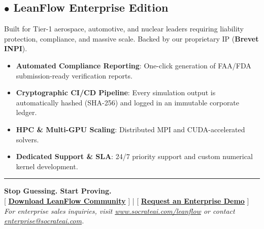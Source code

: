 \documentclass[11pt,a4paper]{article}
\begin{document}
\subsection*{\textcolor{blue!70!black}{$\bullet$} LeanFlow Enterprise Edition}
Built for Tier-1 aerospace, automotive, and nuclear leaders requiring liability protection, compliance, and massive scale. Backed by our proprietary IP (\textbf{Brevet INPI}).
\begin{itemize}
    \item \textbf{Automated Compliance Reporting}: One-click generation of FAA/FDA submission-ready verification reports.
    \item \textbf{Cryptographic CI/CD Pipeline}: Every simulation output is automatically hashed (SHA-256) and logged in an immutable corporate ledger.
    \item \textbf{HPC \& Multi-GPU Scaling}: Distributed MPI and CUDA-accelerated solvers.
    \item \textbf{Dedicated Support \& SLA}: 24/7 priority support and custom numerical kernel development.
\end{itemize}

\vspace{0.5cm}
\hrule
\vspace{0.5cm}

\begin{center}
\textbf{Stop Guessing. Start Proving.} \\ \vspace{0.3cm}
[ \href{https://github.com/socrateai/leanflow}{\textbf{Download LeanFlow Community}} ] | [ \href{https://www.socrateai.com/leanflow}{\textbf{Request an Enterprise Demo}} ] \\ \vspace{0.3cm}
\textit{For enterprise sales inquiries, visit \href{https://www.socrateai.com/leanflow}{www.socrateai.com/leanflow} or contact \href{mailto:enterprise@socrateai.com}{enterprise@socrateai.com}.}
\end{center}
\end{document}
